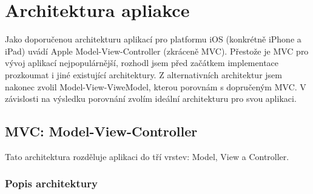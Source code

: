 \section{Architektura apliakce}\label{analyza-architektura}

Jako doporučenou architekturu aplikací pro platformu iOS (konkrétně iPhone a iPad) uvádí Apple Model-View-Controller (zkráceně MVC).
Přestože je MVC pro vývoj aplikací nejpopulárnější, rozhodl jsem před začátkem implementace prozkoumat i jiné existující architektury.
Z alternativních architektur jsem nakonec zvolil Model-View-ViweModel, kterou porovnám s dopručeným MVC.
V závislosti na výsledku porovnání zvolím ideální architekturu pro svou aplikaci.

\subsection{MVC: Model-View-Controller}\label{analyza-mvc}
Tato architektura rozděluje aplikaci do tří vrstev: Model, View a Controller.

\subsubsection{Popis architektury}

